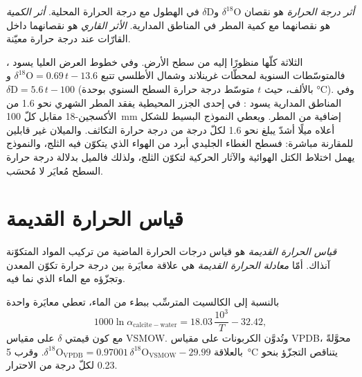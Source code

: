 \begin{definition}\label{def:b3:stable-isotopes:effects}
\emph{أثر درجة الحرارة} هو
نقصان $\delta^{18}\mathrm O$ و$\delta\mathrm D$ في الهطول مع
درجة الحرارة المحلية. \emph{أثر الكمية} هو
نقصانهما مع كمية المطر في المناطق المدارية. \emph{الأثر
القاري} هو نقصانهما داخل القارّات عند
درجة حرارة معيّنة.
\end{definition}

الثلاثة كلّها  منظورًا إليه من سطح الأرض. وفي خطوط العرض العليا
يسود ، فالمتوسّطات السنوية لمحطّات غرينلاند وشمال
الأطلسي تتبع $\delta^{18}\mathrm O = 0.69\,t - 13.6$ و$\delta\mathrm D =
5.6\,t - 100$ (بالألف، حيث $t$ متوسّط درجة حرارة السطح السنوي بوحدة
\unit{\celsius}). وفي المناطق المدارية يسود : في إحدى الجزر المحيطية
يفقد المطر الشهري نحو \qty{1.6}{\permil} من الأكسجين-18 مقابل كلّ
\qty{100}{mm} إضافية من المطر. ويعطي النموذج البسيط للشكل أعلاه ميلًا أشدّ
يبلغ نحو \qty{1.6}{\permil} لكلّ درجة من درجة حرارة التكاثف. والميلان
غير قابلين للمقارنة مباشرة: فسطح الغطاء الجليدي أبرد من الهواء
الذي يتكوّن فيه الثلج، والنموذج يهمل اختلاط الكتل الهوائية
والآثار الحركية لتكوّن الثلج، ولذلك فالميل بدلالة درجة حرارة السطح
مُعايَر لا مُحسَب.

\section{قياس الحرارة القديمة}\label{sec:b3:stable-isotopes:palaeothermometry}

\begin{definition}
\label{def:b3:stable-isotopes:palaeothermometry}
\emph{قياس الحرارة القديمة} هو قياس
درجات الحرارة الماضية من تركيب المواد المتكوّنة آنذاك. أمّا
\emph{معادلة الحرارة القديمة} هي علاقة
معايَرة بين درجة حرارة تكوّن المعدن وتجزّؤه
مع الماء الذي نما فيه.
\end{definition}

بالنسبة إلى الكالسيت المترسِّب ببطء من الماء، تعطي معايَرة واحدة
\[
1000\ln\alpha_{\mathrm{calcite-water}} = 18.03\,\frac{10^3}{T} - 32.42,
\]
مع كون قيمتي $\delta$ على مقياس VSMOW. وتُدوَّن الكربونات على
مقياس VPDB، محوَّلةً بالعلاقة $\delta^{18}\mathrm O_{\mathrm{VPDB}} =
0.97001\,\delta^{18}\mathrm O_{\mathrm{VSMOW}} - 29.99$. وقرب \qty{5}{\celsius} يتناقص
التجزّؤ بنحو \qty{0.23}{\permil} لكلّ درجة من الاحترار.

